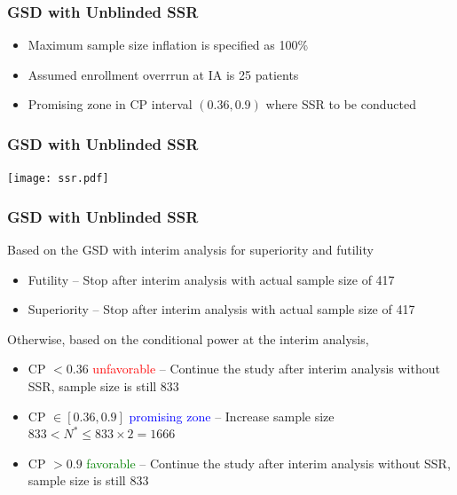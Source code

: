 \documentclass{beamer}
\begin{document}
\begin{frame}
	\frametitle{GSD with Unblinded SSR}
\begin{itemize}
	\item Maximum sample size inflation is specified as 100\%
	\item Assumed enrollment overrrun at IA is 25 patients
	\item Promising zone in CP interval $(0.36, 0.9)$ where SSR to be conducted
\end{itemize}	
\end{frame}
\begin{frame}
	\frametitle{GSD with Unblinded SSR}
	\begin{center}
		\texttt{[image: ssr.pdf]}
	\end{center}
\end{frame}
\begin{frame}
	\frametitle{GSD with Unblinded SSR}
Based on the GSD with interim analysis for superiority and futility \begin{itemize}
	\item Futility -- Stop after interim analysis with actual sample size of 417 
	\item Superiority -- Stop after interim analysis with actual sample size of 417
\end{itemize}

Otherwise, based on the conditional power at the interim analysis,
\begin{itemize}
	\item CP $< 0.36$ \textcolor{red}{unfavorable} -- Continue the study after interim analysis without SSR, sample size is still 833
	\item CP $\in [0.36, 0.9]$ \textcolor{blue}{promising zone}  -- Increase sample size $833 < N^{*} \leq 833\times 2=1666$ 
	\item CP $> 0.9$ \textcolor{green}{favorable} -- Continue the study after interim analysis without SSR, sample size is still 833
\end{itemize}	
\end{frame}
\end{document}

